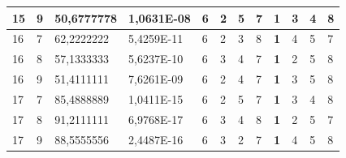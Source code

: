 \documentclass[conference]{IEEEtran}
\begin{document}
\begin{table}[]
\begin{tabular}{|llll|llllllll|}
		\multicolumn{1}{|l|}{15}  & \multicolumn{1}{l|}{9}         & \multicolumn{1}{l|}{50,6777778}    & 1,0631E-08 & \multicolumn{1}{l|}{6}   & \multicolumn{1}{l|}{2}          & \multicolumn{1}{l|}{5}          & \multicolumn{1}{l|}{7}   & \multicolumn{1}{l|}{\textbf{1}} & \multicolumn{1}{l|}{3}          & \multicolumn{1}{l|}{4}          & 8                      \\ \hline
		\multicolumn{1}{|l|}{16}  & \multicolumn{1}{l|}{7}         & \multicolumn{1}{l|}{62,2222222}    & 5,4259E-11 & \multicolumn{1}{l|}{6}   & \multicolumn{1}{l|}{2}          & \multicolumn{1}{l|}{3}          & \multicolumn{1}{l|}{8}   & \multicolumn{1}{l|}{\textbf{1}} & \multicolumn{1}{l|}{4}          & \multicolumn{1}{l|}{5}          & 7                      \\ \hline
		\multicolumn{1}{|l|}{16}  & \multicolumn{1}{l|}{8}         & \multicolumn{1}{l|}{57,1333333}    & 5,6237E-10 & \multicolumn{1}{l|}{6}   & \multicolumn{1}{l|}{3}          & \multicolumn{1}{l|}{4}          & \multicolumn{1}{l|}{7}   & \multicolumn{1}{l|}{\textbf{1}} & \multicolumn{1}{l|}{2}          & \multicolumn{1}{l|}{5}          & 8                      \\ \hline
		\multicolumn{1}{|l|}{16}  & \multicolumn{1}{l|}{9}         & \multicolumn{1}{l|}{51,4111111}    & 7,6261E-09 & \multicolumn{1}{l|}{6}   & \multicolumn{1}{l|}{2}          & \multicolumn{1}{l|}{4}          & \multicolumn{1}{l|}{7}   & \multicolumn{1}{l|}{\textbf{1}} & \multicolumn{1}{l|}{3}          & \multicolumn{1}{l|}{5}          & 8                      \\ \hline
		\multicolumn{1}{|l|}{17}  & \multicolumn{1}{l|}{7}         & \multicolumn{1}{l|}{85,4888889}    & 1,0411E-15 & \multicolumn{1}{l|}{6}   & \multicolumn{1}{l|}{2}          & \multicolumn{1}{l|}{5}          & \multicolumn{1}{l|}{7}   & \multicolumn{1}{l|}{\textbf{1}} & \multicolumn{1}{l|}{3}          & \multicolumn{1}{l|}{4}          & 8                      \\ \hline
		\multicolumn{1}{|l|}{17}  & \multicolumn{1}{l|}{8}         & \multicolumn{1}{l|}{91,2111111}    & 6,9768E-17 & \multicolumn{1}{l|}{6}   & \multicolumn{1}{l|}{3}          & \multicolumn{1}{l|}{4}          & \multicolumn{1}{l|}{8}   & \multicolumn{1}{l|}{\textbf{1}} & \multicolumn{1}{l|}{2}          & \multicolumn{1}{l|}{5}          & 7                      \\ \hline
		\multicolumn{1}{|l|}{17}  & \multicolumn{1}{l|}{9}         & \multicolumn{1}{l|}{88,5555556}    & 2,4487E-16 & \multicolumn{1}{l|}{6}   & \multicolumn{1}{l|}{3}          & \multicolumn{1}{l|}{2}          & \multicolumn{1}{l|}{7}   & \multicolumn{1}{l|}{\textbf{1}} & \multicolumn{1}{l|}{4}          & \multicolumn{1}{l|}{5}          & 8                      \\ \hline

\end{tabular}
\end{table}
\end{document}
